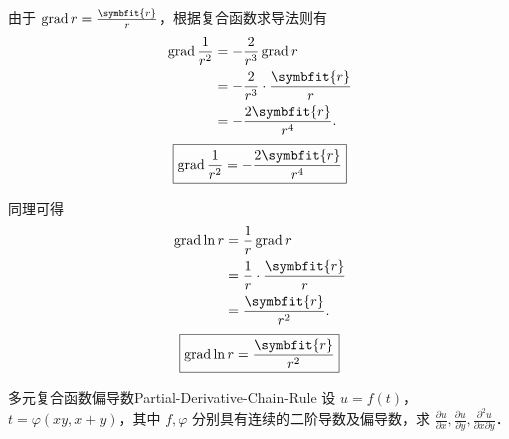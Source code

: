 \begin{solution}

    由于 $\operatorname{grad} r = \frac{\symbfit{r}}{r}$，根据复合函数求导法则有
    \begin{equation}
        \begin{aligned}
            \operatorname{grad} \frac{1}{r^2} & = -\frac{2}{r^3} \operatorname{grad} r       \\
                                              & = -\frac{2}{r^3} \cdot \frac{\symbfit{r}}{r} \\
                                              & = -\frac{2 \symbfit{r}}{r^4}.
        \end{aligned}
    \end{equation}
    \begin{equation}
        \boxed{\operatorname{grad} \frac{1}{r^2} = -\frac{2 \symbfit{r}}{r^4}}
    \end{equation}


    同理可得
    \begin{equation}
        \begin{aligned}
            \operatorname{grad} \ln r & = \frac{1}{r} \operatorname{grad} r       \\
                                      & = \frac{1}{r} \cdot \frac{\symbfit{r}}{r} \\
                                      & = \frac{\symbfit{r}}{r^2}.
        \end{aligned}
    \end{equation}
    \begin{equation}
        \boxed{\operatorname{grad} \ln r = \frac{\symbfit{r}}{r^2}}
    \end{equation}
\end{solution}

\begin{problem}{多元复合函数偏导数}{Partial-Derivative-Chain-Rule}
    设 $u = f(t)$，$t = \varphi(xy, x + y)$，其中 $f, \varphi$ 分别具有连续的二阶导数及偏导数，求 $\frac{\partial u}{\partial x}, \frac{\partial u}{\partial y}, \frac{\partial^2 u}{\partial x \partial y}$．
\end{problem}

